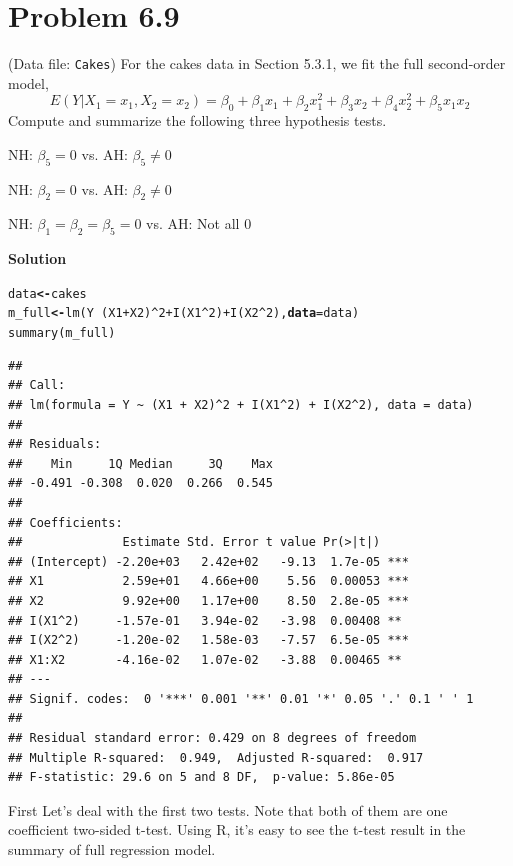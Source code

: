 \documentclass[12pt,oneside,a4paper]{article}\usepackage[]{graphicx}\usepackage[]{xcolor}
\makeatletter
\newcommand{\hlnum}[1]{\textcolor[rgb]{0,0,0}{#1}}%
\newcommand{\hlopt}[1]{\textcolor[rgb]{0,0,0}{#1}}%
\newcommand{\hlstd}[1]{\textcolor[rgb]{0,0,0}{#1}}%
\newcommand{\hlkwb}[1]{\textcolor[rgb]{0.498,0,0.333}{\textbf{#1}}}%
\newcommand{\hlkwc}[1]{\textcolor[rgb]{0.498,0,0.333}{\textbf{#1}}}%
\newcommand{\hlkwd}[1]{\textcolor[rgb]{0,0,0}{#1}}%
\newenvironment{kframe}{%
 \def\at@end@of@kframe{}%
 \ifinner\ifhmode%
  \def\at@end@of@kframe{\end{minipage}}%
  \begin{minipage}{\columnwidth}%
 \fi\fi%
 \def\FrameCommand##1{\hskip\@totalleftmargin \hskip-\fboxsep
 \colorbox{shadecolor}{##1}\hskip-\fboxsep
     \hskip-\linewidth \hskip-\@totalleftmargin \hskip\columnwidth}%
 \MakeFramed {\advance\hsize-\width
   \@totalleftmargin\z@ \linewidth\hsize
   \@setminipage}}%
 {\par\unskip\endMakeFramed%
 \at@end@of@kframe}
\newenvironment{knitrout}{}{} %
\newcommand{\problem}[1]
{
    \clearpage
    \section*{Problem {#1}}
}
\newcommand{\solution}
{
    \vspace{15pt}
    \noindent\ignorespaces\textbf{\large Solution}
}
\newcommand{\m}[1]{\texttt{{#1}}}
\makeatother
\begin{document}
\problem{6.9}
(Data file: \m{Cakes}) For the cakes data in Section 5.3.1, we fit the full second-order model,
$$E(Y|X_{1} = x_{1},X_{2} = x_{2}) = \beta_{0} + \beta_{1}x_{1} + \beta_{2}x_{1}^2 + \beta_{3}x_{2} + \beta_{4}x_{2}^{2} + \beta_{5}x_{1}x_{2}$$
Compute and summarize the following three hypothesis tests.

\begin{center}
NH: $\beta_{5} = 0$ vs. AH: $\beta_{5} \neq 0$

NH: $\beta_{2} = 0$ vs. AH: $\beta_{2} \neq 0$

NH: $\beta_{1} = \beta_{2} = \beta_{5} = 0$ vs. AH: Not all 0
\end{center}

\solution

\begin{knitrout}
\color{fgcolor}\begin{kframe}
\begin{alltt}
\hlstd{data} \hlkwb{<-} \hlstd{cakes}
\hlstd{m_full} \hlkwb{<-} \hlkwd{lm}\hlstd{(Y} \hlopt{~} \hlstd{(X1} \hlopt{+} \hlstd{X2)} \hlopt{^} \hlnum{2} \hlopt{+} \hlkwd{I}\hlstd{(X1} \hlopt{^} \hlnum{2}\hlstd{)} \hlopt{+} \hlkwd{I}\hlstd{(X2} \hlopt{^} \hlnum{2}\hlstd{),} \hlkwc{data} \hlstd{= data)}
\hlkwd{summary}\hlstd{(m_full)}
\end{alltt}
\begin{verbatim}
## 
## Call:
## lm(formula = Y ~ (X1 + X2)^2 + I(X1^2) + I(X2^2), data = data)
## 
## Residuals:
##    Min     1Q Median     3Q    Max 
## -0.491 -0.308  0.020  0.266  0.545 
## 
## Coefficients:
##              Estimate Std. Error t value Pr(>|t|)    
## (Intercept) -2.20e+03   2.42e+02   -9.13  1.7e-05 ***
## X1           2.59e+01   4.66e+00    5.56  0.00053 ***
## X2           9.92e+00   1.17e+00    8.50  2.8e-05 ***
## I(X1^2)     -1.57e-01   3.94e-02   -3.98  0.00408 ** 
## I(X2^2)     -1.20e-02   1.58e-03   -7.57  6.5e-05 ***
## X1:X2       -4.16e-02   1.07e-02   -3.88  0.00465 ** 
## ---
## Signif. codes:  0 '***' 0.001 '**' 0.01 '*' 0.05 '.' 0.1 ' ' 1
## 
## Residual standard error: 0.429 on 8 degrees of freedom
## Multiple R-squared:  0.949,	Adjusted R-squared:  0.917 
## F-statistic: 29.6 on 5 and 8 DF,  p-value: 5.86e-05
\end{verbatim}
\end{kframe}
\end{knitrout}

First Let's deal with the first two tests. Note that both of them are one coefficient two-sided t-test. Using R, it's easy to see the t-test result in the summary of full regression model. 
\end{document}
